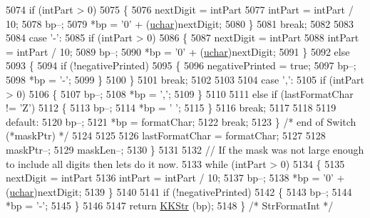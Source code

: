 \begin{DoxyCode}
5074            \textcolor{keywordflow}{if} (intPart > 0)
5075            \{
5076              nextDigit = intPart %
5077              intPart = intPart / 10;
5078              bp--;
5079              *bp = \textcolor{charliteral}{'0'} + (\hyperlink{namespace_k_k_b_ace9969169bf514f9ee6185186949cdf7}{uchar})nextDigit;
5080            \}
5081            \textcolor{keywordflow}{break};
5082 
5083 
5084       \textcolor{keywordflow}{case}  \textcolor{charliteral}{'-'}:
5085            \textcolor{keywordflow}{if}  (intPart > 0)
5086            \{
5087              nextDigit = intPart %
5088              intPart = intPart / 10;
5089              bp--;
5090              *bp = \textcolor{charliteral}{'0'} + (\hyperlink{namespace_k_k_b_ace9969169bf514f9ee6185186949cdf7}{uchar})nextDigit;
5091            \}
5092            \textcolor{keywordflow}{else}
5093            \{
5094              \textcolor{keywordflow}{if}  (!negativePrinted)
5095              \{
5096                negativePrinted = \textcolor{keyword}{true};
5097                bp--;
5098                *bp = \textcolor{charliteral}{'-'};
5099              \}
5100            \}
5101            \textcolor{keywordflow}{break};
5102 
5103 
5104       \textcolor{keywordflow}{case}  \textcolor{charliteral}{','}:
5105            \textcolor{keywordflow}{if}  (intPart > 0)
5106            \{
5107              bp--;
5108              *bp = \textcolor{charliteral}{','};
5109            \}
5110 
5111            \textcolor{keywordflow}{else} \textcolor{keywordflow}{if}  (lastFormatChar != \textcolor{charliteral}{'Z'})
5112            \{
5113              bp--;
5114              *bp = \textcolor{charliteral}{' '};
5115            \}
5116            \textcolor{keywordflow}{break};
5117        
5118 
5119       \textcolor{keywordflow}{default}:
5120            bp--;
5121            *bp = formatChar;
5122            \textcolor{keywordflow}{break};
5123     \}  \textcolor{comment}{/* end of Switch (*maskPtr) */}
5124 
5125 
5126     lastFormatChar = formatChar;
5127 
5128     maskPtr--;
5129     maskLen--;
5130   \}
5131   
5132   \textcolor{comment}{// If the mask was not large enough to include all digits then lets do it now.}
5133   \textcolor{keywordflow}{while}  (intPart > 0)
5134   \{
5135     nextDigit = intPart %
5136     intPart = intPart / 10;
5137     bp--;
5138     *bp = \textcolor{charliteral}{'0'} + (\hyperlink{namespace_k_k_b_ace9969169bf514f9ee6185186949cdf7}{uchar})nextDigit;
5139   \}
5140 
5141   \textcolor{keywordflow}{if}  (!negativePrinted)
5142   \{
5143     bp--;
5144     *bp = \textcolor{charliteral}{'-'};
5145   \}
5146 
5147   \textcolor{keywordflow}{return}  \hyperlink{class_k_k_b_1_1_k_k_str}{KKStr} (bp);
5148 \}  \textcolor{comment}{/* StrFormatInt */}
\end{DoxyCode}
